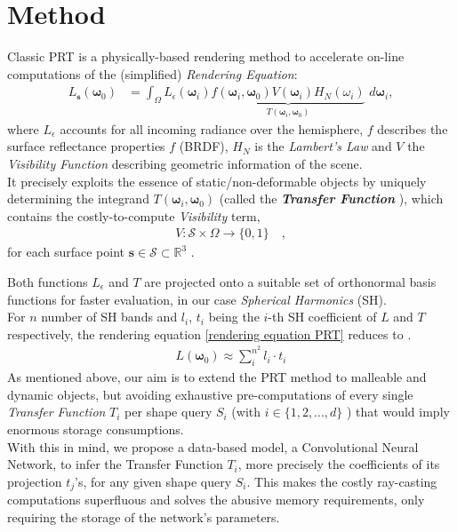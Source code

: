 \section{Method}
Classic PRT  is a physically-based rendering method to accelerate on-line computations of the (simplified) \textit{Rendering Equation}:
\begin{align}
L_{\bm{s}}(\bm{\omega}_0 ) &= 
\int_{\Omega}   L_{\epsilon}(\bm{\omega}_i ) 
\underbrace{f(\bm{\omega}_i,\bm{\omega}_0) 
V(\bm{\omega}_i) H_N(\omega_i) }_{T(\bm{\omega}_i,\bm{\omega}_0) }
\,  \, d\bm{\omega}_i , 
\label{rendering equation PRT}
\end{align}
where $L_{\epsilon}$ accounts for all incoming radiance over the hemisphere, $f$  describes the surface reflectance properties $f$ (BRDF), $H_N$ is the \textit{Lambert's Law} and $V$ the \textit{Visibility Function} describing geometric information of the scene.\\
It precisely exploits the essence of static/non-deformable objects by uniquely determining the integrand $T(\bm{\omega}_i,\bm{\omega}_0)$ (called the \textbf{\textit{Transfer Function}} ), which contains the costly-to-compute  \textit{Visibility} term,
\begin{align*}
V :  \mathcal{S}  \times \Omega \rightarrow \{0,1\} \quad,
\end{align*}
for each surface point $\bm{s} \in \mathcal{S} \subset \mathbb{R}^3$ \cite{CohenBook, sloan2002precomputed}. 

Both functions $L_{\epsilon} $ and $T$  are projected onto a suitable set of orthonormal basis functions for faster evaluation, in our case \textit{Spherical Harmonics} (SH). \\
For $n$ number of SH bands and $l_i$, $t_i$ being the $i$-th SH coefficient of $L$ and $T$ respectively, the rendering equation \ref{rendering equation PRT} reduces to \cite{sloan2002precomputed}. 
\begin{align*}
L(\bm{\omega}_0 ) \approx \sum_{i}^{n^2} l_i \cdot t_i
\end{align*}
As mentioned above, our aim is to extend the PRT method to malleable and dynamic objects, but avoiding exhaustive pre-computations of every single \textit{Transfer Function} $T_i$ per shape query $S_i$ (with $i \in \{1,2,..., d\}$ ) that would imply enormous storage consumptions. \\
With this in mind, we propose a data-based model, a Convolutional Neural Network, to infer the Transfer Function $T_i$, more precisely the coefficients of its projection $t_j$'s, for any given shape query $S_i$. This makes the costly ray-casting computations superfluous and solves the abusive memory requirements, only requiring the storage of the network's parameters. 

